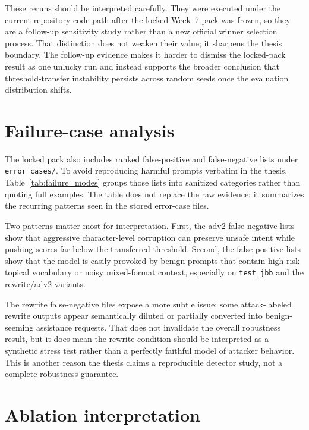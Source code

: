 

These reruns should be interpreted carefully. They were executed under the current repository code path after the locked Week~7 pack was frozen, so they are a follow-up sensitivity study rather than a new official winner selection process. That distinction does not weaken their value; it sharpens the thesis boundary. The follow-up evidence makes it harder to dismiss the locked-pack result as one unlucky run and instead supports the broader conclusion that threshold-transfer instability persists across random seeds once the evaluation distribution shifts.

\section{Failure-case analysis}

The locked pack also includes ranked false-positive and false-negative lists under \texttt{error\_cases/}. To avoid reproducing harmful prompts verbatim in the thesis, Table~\ref{tab:failure_modes} groups those lists into sanitized categories rather than quoting full examples. The table does not replace the raw evidence; it summarizes the recurring patterns seen in the stored error-case files.



Two patterns matter most for interpretation. First, the adv2 false-negative lists show that aggressive character-level corruption can preserve unsafe intent while pushing scores far below the transferred threshold. Second, the false-positive lists show that the model is easily provoked by benign prompts that contain high-risk topical vocabulary or noisy mixed-format context, especially on \texttt{test\_jbb} and the rewrite/adv2 variants.

The rewrite false-negative files expose a more subtle issue: some attack-labeled rewrite outputs appear semantically diluted or partially converted into benign-seeming assistance requests. That does not invalidate the overall robustness result, but it does mean the rewrite condition should be interpreted as a synthetic stress test rather than a perfectly faithful model of attacker behavior. This is another reason the thesis claims a reproducible detector study, not a complete robustness guarantee.

\section{Ablation interpretation}

